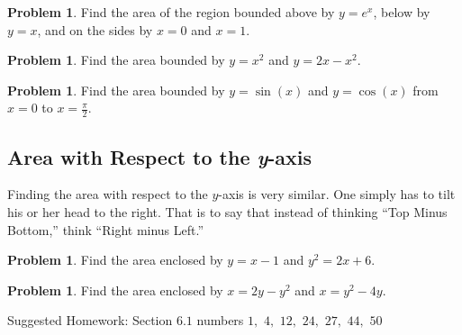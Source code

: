\documentclass[letterpaper, twoside, 12pt]{book}
\theoremstyle{definition}
\theoremstyle{definition}
\newtheorem{motivation}[theorem]{Motivation}
\newtheorem{problem}[theorem]{Problem}
\begin{document}
\begin{problem}
 Find the area of the region bounded above by $y = e^x$, below by $y = x$, and on the sides by $x = 0$ and $x = 1$.
\end{problem}

\newpage

\begin{problem}
 Find the area bounded by $y = x^2$ and $y = 2x-x^2$.
\end{problem}

\vfill

\begin{problem}
 Find the area bounded by $y = \sin(x)$ and $y = \cos(x)$ from $x = 0$ to $x = \frac{\pi}{2}$.
\end{problem}

\vfill

\newpage

\subsection{Area with Respect to the \emph{y}-axis}

Finding the area with respect to the $y$-axis is very similar.  One simply has to tilt his or her head to the right.  That is to say that instead of thinking ``Top Minus Bottom,'' think ``Right minus Left.''

\begin{problem}
 Find the area enclosed by $y = x-1$ and $y^2 = 2x+6$.
\end{problem}

\vfill

\begin{problem}
 Find the area enclosed by $x = 2y-y^2$ and $x = y^2-4y$.
\end{problem}

\vfill

\noindent Suggested Homework: Section $6.1$ numbers $1,$ $4,$ $12,$ $24,$ $27,$ $44,$ $50$



\end{document}
